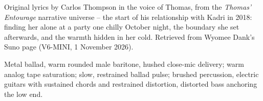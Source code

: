 
\label{sec:warm-hidden-in-the-cold}
\begin{notes}
Original lyrics by Carlos Thompson in the voice of Thomas, from the \emph{Thomas' Entourage} narrative universe -- the start of his relationship with Kadri in 2018: finding her alone at a party one chilly October night, the boundary she set afterwards, and the warmth hidden in her cold. Retrieved from Wyomee Dank's Suno page (V6-MINI, 1 November 2026).
\end{notes}
\begin{style}
Metal ballad, warm rounded male baritone, hushed close-mic delivery; warm analog tape saturation; slow, restrained ballad pulse; brushed percussion, electric guitars with sustained chords and restrained distortion, distorted bass anchoring the low end.
\end{style}
